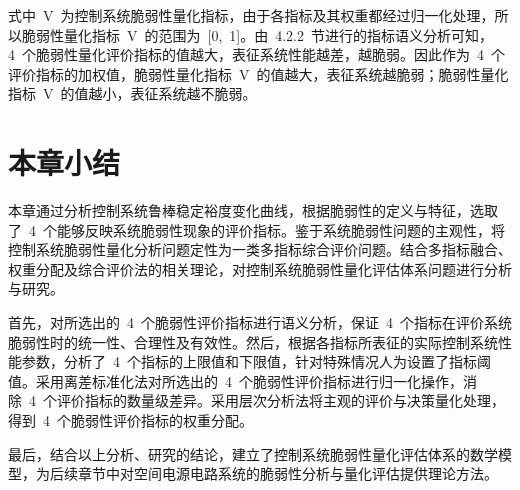 式中~V~为控制系统脆弱性量化指标，由于各指标及其权重都经过归一化处理，所以脆弱性量化指标~V~的范围为~[0,~1]。由~4.2.2~节进行的指标语义分析可知，4~个脆弱性量化评价指标的值越大，表征系统性能越差，越脆弱。因此作为~4~个评价指标的加权值，脆弱性量化指标~V~的值越大，表征系统越脆弱；脆弱性量化指标~V~的值越小，表征系统越不脆弱。
\section{本章小结}
\label{sec:chap4:sum}
本章通过分析控制系统鲁棒稳定裕度变化曲线，根据脆弱性的定义与特征，选取了~4~个能够反映系统脆弱性现象的评价指标。鉴于系统脆弱性问题的主观性，将控制系统脆弱性量化分析问题定性为一类多指标综合评价问题。结合多指标融合、权重分配及综合评价法的相关理论，对控制系统脆弱性量化评估体系问题进行分析与研究。

首先，对所选出的~4~个脆弱性评价指标进行语义分析，保证~4~个指标在评价系统脆弱性时的统一性、合理性及有效性。然后，根据各指标所表征的实际控制系统性能参数，分析了~4~个指标的上限值和下限值，针对特殊情况人为设置了指标阈值。采用离差标准化法对所选出的~4~个脆弱性评价指标进行归一化操作，消除~4~个评价指标的数量级差异。采用层次分析法将主观的评价与决策量化处理，得到~4~个脆弱性评价指标的权重分配。

最后，结合以上分析、研究的结论，建立了控制系统脆弱性量化评估体系的数学模型，为后续章节中对空间电源电路系统的脆弱性分析与量化评估提供理论方法。